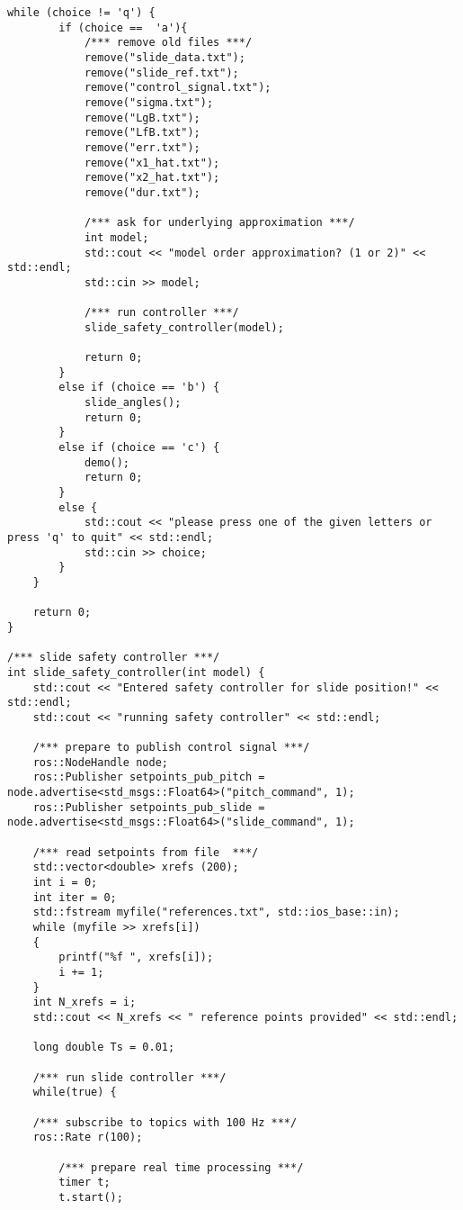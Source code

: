 \begin{lstlisting}[language=gedit]
    while (choice != 'q') {
        if (choice ==  'a'){
            /*** remove old files ***/
            remove("slide_data.txt"); 
            remove("slide_ref.txt");
            remove("control_signal.txt");
            remove("sigma.txt");
            remove("LgB.txt");
            remove("LfB.txt");
            remove("err.txt");
            remove("x1_hat.txt");
            remove("x2_hat.txt");
            remove("dur.txt");

            /*** ask for underlying approximation ***/ 
            int model;
            std::cout << "model order approximation? (1 or 2)" << std::endl;
            std::cin >> model;

            /*** run controller ***/
            slide_safety_controller(model);

            return 0;
        }
        else if (choice == 'b') {
            slide_angles();
            return 0;
        }
        else if (choice == 'c') {
            demo();
            return 0;
        }
        else {
            std::cout << "please press one of the given letters or press 'q' to quit" << std::endl;
            std::cin >> choice;
        }
    }

    return 0;
}

/*** slide safety controller ***/
int slide_safety_controller(int model) {
    std::cout << "Entered safety controller for slide position!" << std::endl;
    std::cout << "running safety controller" << std::endl;
   
    /*** prepare to publish control signal ***/ 
    ros::NodeHandle node;
    ros::Publisher setpoints_pub_pitch = node.advertise<std_msgs::Float64>("pitch_command", 1);
    ros::Publisher setpoints_pub_slide = node.advertise<std_msgs::Float64>("slide_command", 1);

    /*** read setpoints from file  ***/
    std::vector<double> xrefs (200);
    int i = 0;
    int iter = 0;
    std::fstream myfile("references.txt", std::ios_base::in);
    while (myfile >> xrefs[i])
    {
        printf("%f ", xrefs[i]);
        i += 1; 
    }
    int N_xrefs = i;
    std::cout << N_xrefs << " reference points provided" << std::endl;

    long double Ts = 0.01;

    /*** run slide controller ***/
    while(true) {

    /*** subscribe to topics with 100 Hz ***/
    ros::Rate r(100);

        /*** prepare real time processing ***/
        timer t;
        t.start();


\end{lstlisting}
